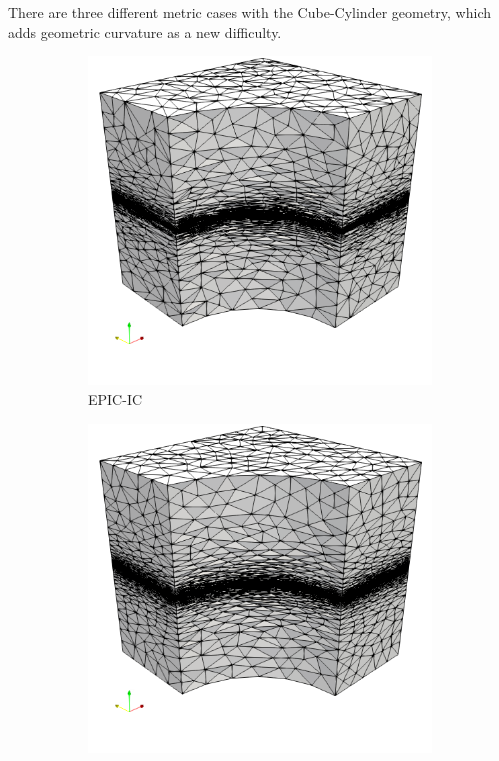 \documentclass[3p,times,procedia,number]{elsarticle}
\begin{document}
There are three different metric cases with the Cube-Cylinder geometry,
which adds geometric curvature as a new difficulty.
\begin{figure}
\begin{subfigure}{.24\textwidth}
\centering
\includegraphics[width=\textwidth]{epic-ic-cube-cylinder-linear.png}
\caption{EPIC-IC}
\end{subfigure}
\begin{subfigure}{.24\textwidth}
\centering
\includegraphics[width=\textwidth]{epic-ics-cube-cylinder-linear.png}

\end{subfigure}
\end{figure}
\end{document}
